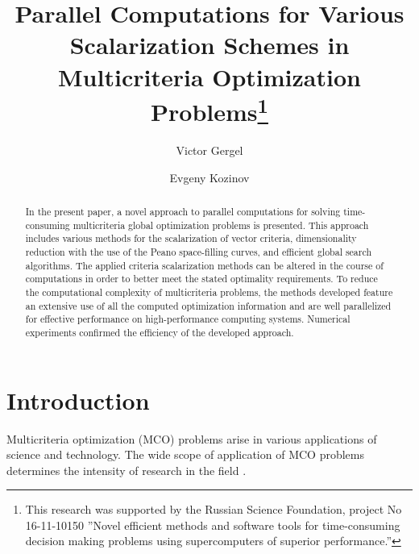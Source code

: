 \documentclass[runningheads]{llncs}
\begin{document}
%
\title{Parallel Computations for Various Scalarization Schemes in Multicriteria Optimization Problems\thanks{This research was supported by the Russian Science Foundation, project No 16-11-10150 ''Novel efficient methods and software tools for time-consuming decision making problems using supercomputers of superior performance.''}}
%
%
\author{Victor Gergel \and Evgeny Kozinov }

%
%
\maketitle              %
%
\begin{abstract}
In the present paper, a novel approach to parallel computations for solving time-consuming multicriteria global optimization problems is presented. This approach includes various methods for the scalarization of vector criteria, dimensionality reduction with the use of the Peano space-filling curves, and efficient global search algorithms. The applied criteria scalarization methods can be altered in the course of computations in order to better meet the stated optimality requirements. To reduce the computational complexity of multicriteria problems, the methods  developed feature an extensive use of all the computed optimization information and are well parallelized for effective performance on high-performance computing systems. Numerical experiments confirmed the efficiency of the developed approach.

\end{abstract}
%
%
%
\section{Introduction} \label{sec:1}
 
Multicriteria optimization (MCO) problems arise in various applications of science and technology. The wide scope of application of MCO problems determines the intensity of research in the field \cite{c1,c2,c3,c4,c5}.
\end{document}
